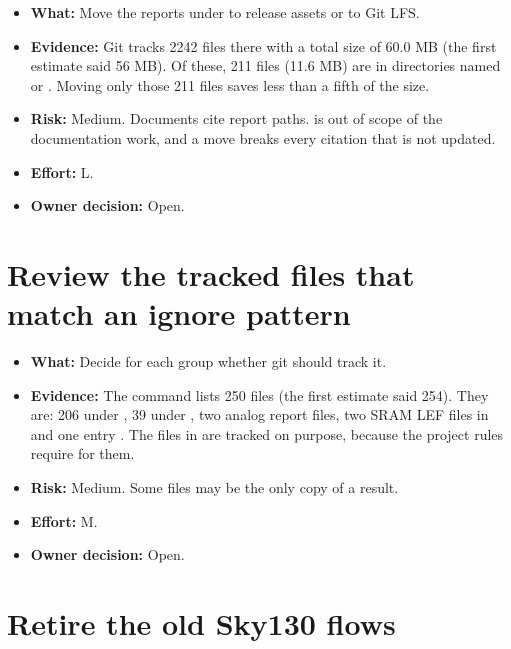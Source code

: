 \begin{itemize}
\item \textbf{What:} Move the reports under  to release assets or to Git LFS.
\item \textbf{Evidence:} Git tracks 2242 files there with a total size of 60.0 MB (the first estimate said 56 MB). Of these, 211 files (11.6 MB) are in directories named  or . Moving only those 211 files saves less than a fifth of the size.
\item \textbf{Risk:} Medium. Documents cite report paths.  is out of scope of the documentation work, and a move breaks every citation that is not updated.
\item \textbf{Effort:} L.
\item \textbf{Owner decision:} Open.
\end{itemize}

\section{Review the tracked files that match an ignore pattern}\label{um:guide:cleanup-recommendations:ignored-tracked}

\begin{itemize}
\item \textbf{What:} Decide for each group whether git should track it.
\item \textbf{Evidence:} The command  lists 250 files (the first estimate said 254). They are: 206 under , 39 under , two analog report files, two SRAM LEF files in  and one entry . The files in  are tracked on purpose, because the project rules require  for them.
\item \textbf{Risk:} Medium. Some files may be the only copy of a result.
\item \textbf{Effort:} M.
\item \textbf{Owner decision:} Open.
\end{itemize}

\section{Retire the old Sky130 flows}\label{um:guide:cleanup-recommendations:legacy-flows}

